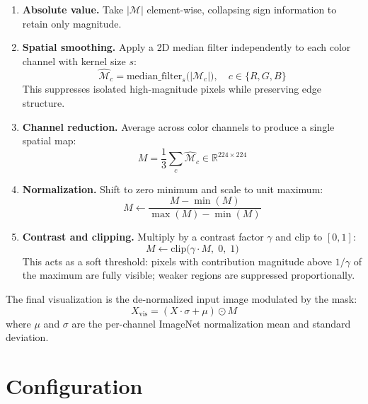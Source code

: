 \documentclass[11pt]{article}
\begin{document}
\begin{enumerate}
    \item \textbf{Absolute value.} Take $|\mathcal{M}|$ element-wise, collapsing sign information to retain only magnitude.

    \item \textbf{Spatial smoothing.} Apply a 2D median filter independently to each color channel with kernel size $s$:
    \begin{equation}
        \hat{\mathcal{M}}_c = \mathrm{median\_filter}_s\!\bigl(|\mathcal{M}_c|\bigr), \quad c \in \{R, G, B\}
    \end{equation}
    This suppresses isolated high-magnitude pixels while preserving edge structure.

    \item \textbf{Channel reduction.} Average across color channels to produce a single spatial map:
    \begin{equation}
        M = \frac{1}{3} \sum_c \hat{\mathcal{M}}_c \in \mathbb{R}^{224 \times 224}
    \end{equation}

    \item \textbf{Normalization.} Shift to zero minimum and scale to unit maximum:
    \begin{equation}
        M \leftarrow \frac{M - \min(M)}{\max(M) - \min(M)}
    \end{equation}

    \item \textbf{Contrast and clipping.} Multiply by a contrast factor $\gamma$ and clip to $[0, 1]$:
    \begin{equation}
        M \leftarrow \mathrm{clip}\bigl(\gamma \cdot M,\; 0,\; 1\bigr)
    \end{equation}
    This acts as a soft threshold: pixels with contribution magnitude above $1/\gamma$ of the maximum are fully visible; weaker regions are suppressed proportionally.
\end{enumerate}

The final visualization is the de-normalized input image modulated by the mask:
\begin{equation}
    X_{\mathrm{vis}} = (X \cdot \sigma + \mu) \odot M
\end{equation}
where $\mu$ and $\sigma$ are the per-channel ImageNet normalization mean and standard deviation.

\section{Configuration}
\end{document}
